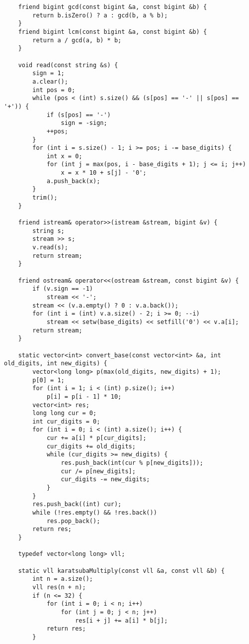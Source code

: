 \documentclass[a4paper,12pt]{report}
\begin{document}
\begin{lstlisting}
    friend bigint gcd(const bigint &a, const bigint &b) {
        return b.isZero() ? a : gcd(b, a % b);
    }
    friend bigint lcm(const bigint &a, const bigint &b) {
        return a / gcd(a, b) * b;
    }

    void read(const string &s) {
        sign = 1;
        a.clear();
        int pos = 0;
        while (pos < (int) s.size() && (s[pos] == '-' || s[pos] == '+')) {
            if (s[pos] == '-')
                sign = -sign;
            ++pos;
        }
        for (int i = s.size() - 1; i >= pos; i -= base_digits) {
            int x = 0;
            for (int j = max(pos, i - base_digits + 1); j <= i; j++)
                x = x * 10 + s[j] - '0';
            a.push_back(x);
        }
        trim();
    }

    friend istream& operator>>(istream &stream, bigint &v) {
        string s;
        stream >> s;
        v.read(s);
        return stream;
    }

    friend ostream& operator<<(ostream &stream, const bigint &v) {
        if (v.sign == -1)
            stream << '-';
        stream << (v.a.empty() ? 0 : v.a.back());
        for (int i = (int) v.a.size() - 2; i >= 0; --i)
            stream << setw(base_digits) << setfill('0') << v.a[i];
        return stream;
    }

    static vector<int> convert_base(const vector<int> &a, int old_digits, int new_digits) {
        vector<long long> p(max(old_digits, new_digits) + 1);
        p[0] = 1;
        for (int i = 1; i < (int) p.size(); i++)
            p[i] = p[i - 1] * 10;
        vector<int> res;
        long long cur = 0;
        int cur_digits = 0;
        for (int i = 0; i < (int) a.size(); i++) {
            cur += a[i] * p[cur_digits];
            cur_digits += old_digits;
            while (cur_digits >= new_digits) {
                res.push_back(int(cur % p[new_digits]));
                cur /= p[new_digits];
                cur_digits -= new_digits;
            }
        }
        res.push_back((int) cur);
        while (!res.empty() && !res.back())
            res.pop_back();
        return res;
    }

    typedef vector<long long> vll;

    static vll karatsubaMultiply(const vll &a, const vll &b) {
        int n = a.size();
        vll res(n + n);
        if (n <= 32) {
            for (int i = 0; i < n; i++)
                for (int j = 0; j < n; j++)
                    res[i + j] += a[i] * b[j];
            return res;
        }


\end{lstlisting}
\end{document}
